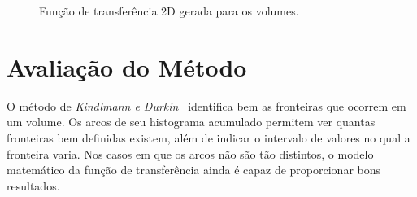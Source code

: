 \begin{figure}[]
	\centering
	\caption{Função de transferência 2D gerada para os volumes.}
	\label{fig:g_res_fts_2d}
\end{figure}

\clearpage
\section{Avaliação do Método}
\label{sec:gordon.aval}
	O método de \textit{Kindlmann e Durkin}~\cite{gordon} identifica bem as fronteiras que ocorrem em um volume. Os arcos de seu histograma acumulado permitem ver quantas fronteiras bem definidas existem, além de indicar o intervalo de valores no qual a fronteira varia. Nos casos em que os arcos não são tão distintos, o modelo matemático da função de transferência ainda é capaz de proporcionar bons resultados.
	
